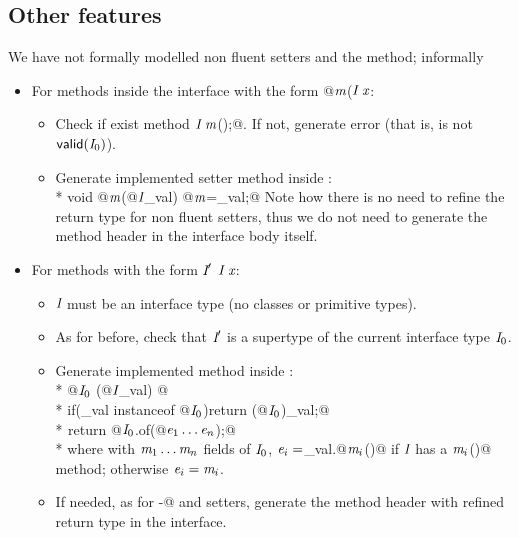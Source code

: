 \subsection{Other features}

We have not formally modelled non fluent setters and the \Q@with@ method; informally
\begin{itemize}
\item For methods inside the interface with the form \Q@void @$\textit{m}$\QM($\C\ \x$\QM{);}:
  \begin{itemize}
    \item Check if exist method $\C\ \m$\Q@();@. If not, generate error (that is, is not $\textsf{valid}(\textit{I}_0)$).
    \item Generate implemented setter method inside \Q@of@:\\*
           \Q@public void @$\textit{m}$\Q@(@$\textit{I}$\Q@ _val) { @$\textit{m}$\Q@=_val;}@
    Note how there is no need to refine the return type for non fluent setters, thus we do not need to generate the method header in the interface body itself.
    \end{itemize}
\item For methods with the form $\C'\ $$\C\ \x$\QM{);}:
  \begin{itemize}
   \item $\textit{I}$ must be an interface type (no classes or primitive types).
    \item As for before, check that $\textit{I}'$ is a supertype of the current interface type $\textit{I}_0$.
    \item Generate implemented \Q@with@ method inside \Q@of@:\\*
           \Q@public @$\textit{I}_0\ $\Q@with(@$\textit{I}$\Q@ _val) { @\\*
           \Q@  if(_val instanceof @$\textit{I}_0$\Q@){return (@$\textit{I}_0$\Q@)_val;}@\\*
${}_{}$\Q@  return @$\textit{I}_0$\Q@.of(@$\textit{e}_1\ldots\textit{e}_n$\Q@);}@\\*
where with $\textit{m}_1\ldots\textit{m}_n$  fields of $\textit{I}_0$,
$\textit{e}_i=$\Q@_val.@$\textit{m}_i$\Q@()@ if $\textit{I}$ has a $\textit{m}_i$\Q@()@ method; otherwise
$\textit{e}_i=\textit{m}_i$.
    \item If needed, as for \Q@with-@ and setters, generate the method header with refined return type in the interface.
 \end{itemize}

\end{itemize}




